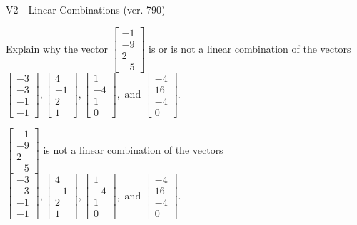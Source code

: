 \begin{exercise}
  \begin{exerciseTitle}V2 - Linear Combinations (ver. 790)\end{exerciseTitle}
  \begin{exerciseStatement}
    Explain why the vector \(\left[\begin{array}{c}
-1 \\
-9 \\
2 \\
-5
\end{array}\right]\)  is or is not a linear 
	combination of the vectors \(\left[\begin{array}{c}
-3 \\
-3 \\
-1 \\
-1
\end{array}\right] , \left[\begin{array}{c}
4 \\
-1 \\
2 \\
1
\end{array}\right] , \left[\begin{array}{c}
1 \\
-4 \\
1 \\
0
\end{array}\right] , \text{ and } \left[\begin{array}{c}
-4 \\
16 \\
-4 \\
0
\end{array}\right]\).
	


  \end{exerciseStatement}
  \begin{exerciseAnswer}
   \(\left[\begin{array}{c}
-1 \\
-9 \\
2 \\
-5
\end{array}\right]\) 
  	 is not  
	a linear combination of the vectors \(\left[\begin{array}{c}
-3 \\
-3 \\
-1 \\
-1
\end{array}\right] , \left[\begin{array}{c}
4 \\
-1 \\
2 \\
1
\end{array}\right] , \left[\begin{array}{c}
1 \\
-4 \\
1 \\
0
\end{array}\right] , \text{ and } \left[\begin{array}{c}
-4 \\
16 \\
-4 \\
0
\end{array}\right]\).


\end{exerciseAnswer}
\end{exercise}
